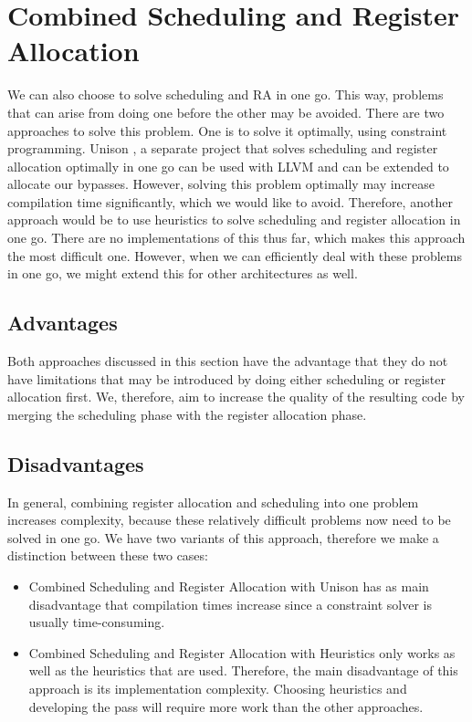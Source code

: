 \section{Combined Scheduling and Register Allocation}\label{sec:combined_sched_ra}
We can also choose to solve scheduling and RA in one go. This way, problems that can arise from doing one before the other may be avoided. There are two approaches to solve this problem. One is to solve it optimally, using constraint programming. Unison \cite{unison}, a separate project that solves scheduling and register allocation optimally in one go can be used with LLVM and can be extended to allocate our bypasses. However, solving this problem optimally may increase compilation time significantly, which we would like to avoid. Therefore, another approach would be to use heuristics to solve scheduling and register allocation in one go. There are no implementations of this thus far, which makes this approach the most difficult one. However, when we can efficiently deal with these problems in one go, we might extend this for other architectures as well. 

\subsection{Advantages}
Both approaches discussed in this section have the advantage that they do not have limitations that may be introduced by doing either scheduling or register allocation first. We, therefore, aim to increase the quality of the resulting code by merging the scheduling phase with the register allocation phase. 

\subsection{Disadvantages}
In general, combining register allocation and scheduling into one problem increases complexity, because these relatively difficult problems now need to be solved in one go. 
We have two variants of this approach, therefore we make a distinction between these two cases:
\begin{itemize}
\item Combined Scheduling and Register Allocation with Unison has as main disadvantage that compilation times increase since a constraint solver is usually time-consuming.
\item Combined Scheduling and Register Allocation with Heuristics only works as well as the heuristics that are used. Therefore, the main disadvantage of this approach is its implementation complexity. Choosing heuristics and developing the pass will require more work than the other approaches.
\end{itemize}
